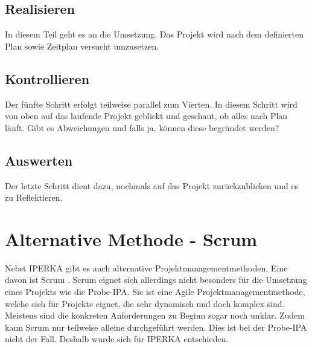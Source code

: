 \subsection{Realisieren}
In diesem Teil geht es an die Umsetzung. Das Projekt wird nach dem definierten Plan sowie Zeitplan versucht umzusetzen.

\subsection{Kontrollieren}
Der fünfte Schritt erfolgt teilweise parallel zum Vierten. In diesem Schritt wird von oben auf das laufende Projekt geblickt und geschaut, ob alles nach Plan läuft. Gibt es Abweichungen und falls ja, können diese begründet werden?

\subsection{Auswerten}
Der letzte Schritt dient dazu, nochmals auf das Projekt zurückzublicken und es zu Reflektieren.

\section{Alternative Methode - Scrum}\label{sec:alternative-methode}
Nebst IPERKA gibt es auch alternative Projektmanagementmethoden. Eine davon ist Scrum \cite{scrum}. 
Scrum eignet sich allerdings nicht besonders für die Umsetzung eines Projekts wie die Probe-IPA.  Sie ist eine Agile Projektmanagementmethode, welche sich für Projekte eignet, die sehr dynamisch und doch komplex sind. Meistens sind die konkreten Anforderungen zu Beginn sogar noch unklar. Zudem kann Scrum nur teilweise alleine durchgeführt werden.
Dies ist bei der Probe-IPA nicht der Fall. Deshalb wurde sich für IPERKA entschieden.
